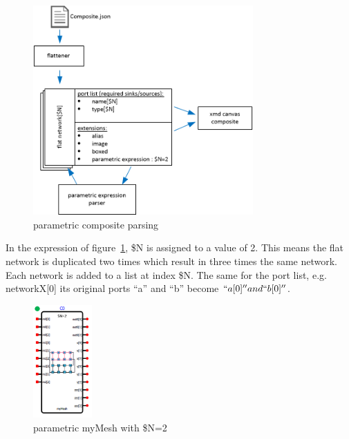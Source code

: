 \begin{figure}[here]
\includegraphics[width=0.75\textwidth]{pictures/composite-parametric-parsing}
\caption{parametric composite parsing}
\label{fig:parametric-composite-parsing}
\end{figure}

In the expression of figure~\ref{fig:parametric-composite-parsing}, \$N is
assigned to a value of 2. This means the flat network is duplicated two times
which result in three times the same network. Each network is added to a list at
index \$N. The same for the port list, e.g. networkX[0] its original ports ``a''
and ``b'' become $``a[0]'' and ``b[0]''$.

\begin{figure}
  \vspace{-20pt}
  \begin{center}
    \includegraphics[width=0.20\textwidth]{pictures/parametric-composite1}
  \caption{parametric myMesh with \$N=2}
  \label{fig:parametric-composite1}
  \end{center}
  \vspace{-20pt}
\end{figure}

